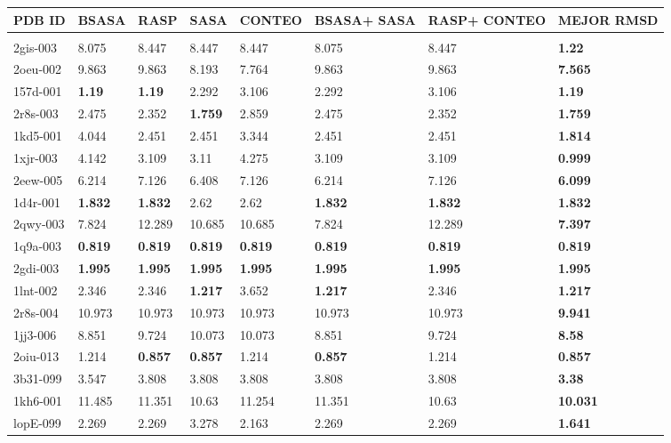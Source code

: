 \begin{table}[!htp]
\begin{tabular}{p{48pt}|p{40pt} p{40pt} p{40pt} p{43pt} p{47pt} p{49pt} p{43pt}}
PDB ID& BSASA& RASP& SASA& CONTEO& BSASA+ SASA& RASP+ CONTEO& MEJOR RMSD \\
\hline \\
2gis-003 & 8.075 & 8.447& 8.447& 8.447& 8.075& 8.447& \textbf{1.22}\\
2oeu-002 & 9.863& 9.863& 8.193& 7.764& 9.863& 9.863& \textbf{7.565}\\
157d-001 & \textbf{1.19} & \textbf{1.19} &2.292& 3.106 &2.292 &3.106 & \textbf{1.19}\\
2r8s-003 & 2.475 & 2.352 & \textbf{1.759} & 2.859 & 2.475 & 2.352 & \textbf{1.759}\\
1kd5-001 & 4.044 & 2.451 & 2.451 & 3.344 & 2.451 & 2.451 & \textbf{1.814} \\
1xjr-003 & 4.142 & 3.109 & 3.11 & 4.275 & 3.109 & 3.109 & \textbf{0.999} \\
2eew-005 & 6.214 & 7.126 & 6.408 & 7.126 & 6.214 & 7.126 & \textbf{6.099} \\
1d4r-001 & \textbf{1.832} & \textbf{1.832} & 2.62 & 2.62 & \textbf{1.832} & \textbf{1.832} & \textbf{1.832} \\
2qwy-003 & 7.824 & 12.289 & 10.685 & 10.685 & 7.824 & 12.289 & \textbf{7.397} \\
1q9a-003 & \textbf{0.819} & \textbf{0.819} & \textbf{0.819} & \textbf{0.819} & \textbf{0.819} & \textbf{0.819} & \textbf{0.819} \\
2gdi-003 & \textbf{1.995} & \textbf{1.995} & \textbf{1.995} & \textbf{1.995} & \textbf{1.995} & \textbf{1.995} & \textbf{1.995} \\
1lnt-002 & 2.346 & 2.346 & \textbf{1.217} & 3.652 & \textbf{1.217} & 2.346 & \textbf{1.217} \\
2r8s-004 & 10.973 & 10.973 & 10.973 & 10.973 & 10.973 & 10.973 & \textbf{9.941} \\
1jj3-006 & 8.851 & 9.724 & 10.073 & 10.073 & 8.851 & 9.724 & \textbf{8.58} \\
2oiu-013 & 1.214 & \textbf{0.857} & \textbf{0.857} & 1.214 & \textbf{0.857} & 1.214 & \textbf{0.857} \\
3b31-099 & 3.547 & 3.808 & 3.808 & 3.808 & 3.808 & 3.808 & \textbf{3.38} \\
1kh6-001 & 11.485 & 11.351 & 10.63 & 11.254 & 11.351 & 10.63 & \textbf{10.031} \\
lopE-099 & 2.269 & 2.269 & 3.278 & 2.163 & 2.269 & 2.269 & \textbf{1.641} \\

\end{tabular}
\end{table}
